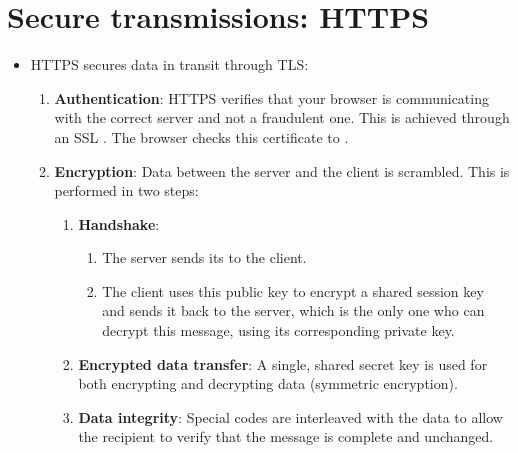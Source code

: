 \section{Secure transmissions: \gls{HTTPS}}
\begin{itemize}
\item \gls{HTTPS} secures data in transit through \gls{TLS}:
  \begin{enumerate}
  \item \textbf{Authentication}: \gls{HTTPS} verifies that your
    browser is communicating with the correct server and not a
    fraudulent one. This is achieved through an \gls{SSL}
    . The browser checks this
    certificate to .
  \item \textbf{Encryption}: Data between the server and the client is
    scrambled. This is performed in two steps:
    \begin{enumerate}
    \item \textbf{Handshake}:
      \begin{enumerate}
      \item The server sends its  to the client.
      \item The client uses this public key to encrypt a shared
        session key and sends it back to the server, which is the only
        one who can decrypt this message, using its corresponding
        private key.
      \end{enumerate}
    \item \textbf{Encrypted data transfer}: A single, shared secret
      key is used for both encrypting and decrypting data (symmetric
      encryption).
    \item \textbf{Data integrity}: Special codes are interleaved with
      the data to allow the recipient to verify that the message is
      complete and unchanged.
    \end{enumerate}
  \end{enumerate}
\end{itemize}

